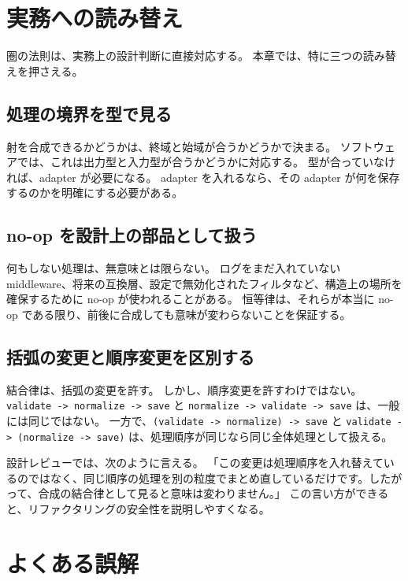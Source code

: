 \section{実務への読み替え}

圏の法則は、実務上の設計判断に直接対応する。
本章では、特に三つの読み替えを押さえる。

\subsection{処理の境界を型で見る}

射を合成できるかどうかは、終域と始域が合うかどうかで決まる。
ソフトウェアでは、これは出力型と入力型が合うかどうかに対応する。
型が合っていなければ、adapter が必要になる。
adapter を入れるなら、その adapter が何を保存するのかを明確にする必要がある。

\subsection{no-op を設計上の部品として扱う}

何もしない処理は、無意味とは限らない。
ログをまだ入れていない middleware、将来の互換層、設定で無効化されたフィルタなど、構造上の場所を確保するために no-op が使われることがある。
恒等律は、それらが本当に no-op である限り、前後に合成しても意味が変わらないことを保証する。

\subsection{括弧の変更と順序変更を区別する}

結合律は、括弧の変更を許す。
しかし、順序変更を許すわけではない。
\texttt{validate -> normalize -> save} と \texttt{normalize -> validate -> save} は、一般には同じではない。
一方で、\texttt{(validate -> normalize) -> save} と \texttt{validate -> (normalize -> save)} は、処理順序が同じなら同じ全体処理として扱える。

\begin{softwarebox}
設計レビューでは、次のように言える。
「この変更は処理順序を入れ替えているのではなく、同じ順序の処理を別の粒度でまとめ直しているだけです。したがって、合成の結合律として見ると意味は変わりません。」
この言い方ができると、リファクタリングの安全性を説明しやすくなる。
\end{softwarebox}

\section{よくある誤解}

